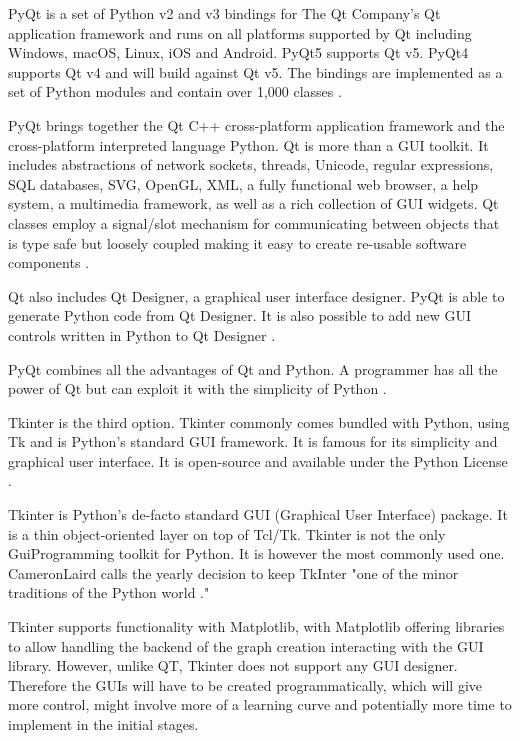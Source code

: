 	PyQt is a set of Python v2 and v3 bindings for The Qt Company's Qt application framework and runs on all platforms supported by Qt including Windows, macOS, Linux, iOS and Android. PyQt5 supports Qt v5. PyQt4 supports Qt v4 and will build against Qt v5. The bindings are implemented as a set of Python modules and contain over 1,000 classes \cite{pyqt_rbc}.
	
	PyQt brings together the Qt C++ cross-platform application framework and the cross-platform interpreted language Python.
	Qt is more than a GUI toolkit. It includes abstractions of network sockets, threads, Unicode, regular expressions, SQL databases, SVG, OpenGL, XML, a fully functional web browser, a help system, a multimedia framework, as well as a rich collection of GUI widgets.
	Qt classes employ a signal/slot mechanism for communicating between objects that is type safe but loosely coupled making it easy to create re-usable software components \cite{pyqt_rbc}.
	
	Qt also includes Qt Designer, a graphical user interface designer. PyQt is able to generate Python code from Qt Designer. It is also possible to add new GUI controls written in Python to Qt Designer \cite{pyqt_rbc}.
	
	PyQt combines all the advantages of Qt and Python. A programmer has all the power of Qt but can exploit it with the simplicity of Python \cite{pyqt_rbc}.
	
	Tkinter is the third option. Tkinter commonly comes bundled with Python, using Tk and is Python's standard GUI framework. It is famous for its simplicity and graphical user interface. It is open-source and available under the Python License \cite{data_camp_gui}.
	
	Tkinter is Python's de-facto standard GUI (Graphical User Interface) package. It is a thin object-oriented layer on top of Tcl/Tk.
	Tkinter is not the only GuiProgramming toolkit for Python. It is however the most commonly used one. CameronLaird calls the yearly decision to keep TkInter "one of the minor traditions of the Python world \cite{py_tkinter}."
	
	Tkinter supports functionality with Matplotlib, with Matplotlib offering libraries to allow handling the backend of the graph creation interacting with the GUI library. However, unlike QT, Tkinter does not support any GUI designer. Therefore the GUIs will have to be created programmatically, which will give more control, might involve more of a learning curve and potentially more time to implement in the initial stages.
	
